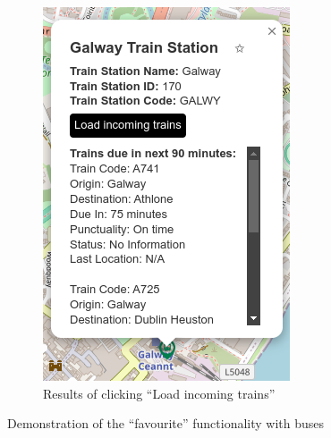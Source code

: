 \documentclass[a4paper,11pt]{report}
\begin{document}
\begin{figure}[H]
\begin{subfigure}[c]{0.38\textwidth}
        \includegraphics[width=\textwidth]{./images/loadstationdata.png}
        \caption{Results of clicking ``Load incoming trains''}
    \end{subfigure}
    \caption{Demonstration of the ``favourite'' functionality with buses}
\end{figure}
\end{document}
